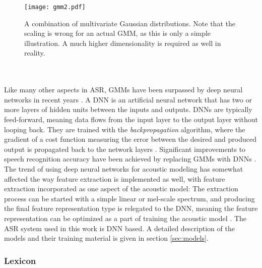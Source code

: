 \documentclass[english, 12pt, a4paper, pdftex, elec, utf8]{aaltothesis}
\begin{document}
\begin{figure}[b]
	\centering
	\texttt{[image: gmm2.pdf]}
	\caption{A combination of multivariate Gaussian distributions. Note that the scaling is wrong for an actual GMM, as this is only a simple illustration. A much higher dimensionality is required as well in reality.}
	\label{fig:gmm} 
\end{figure} \\\\
Like many other aspects in ASR, GMMs have been surpassed by deep neural networks in recent years \cite{hinton2012deep}. A DNN is an artificial neural network that has two or more layers of hidden units between the inputs and outputs. DNNs are typically feed-forward, meaning data flows from the input layer to the output layer without looping back. They are trained with the \textit{backpropagation} algorithm, where the gradient of a cost function measuring the error between the desired and produced output is propagated back to the network layers \cite[p.~57--60]{yu2014automatic}. Significant improvements to speech recognition accuracy have been achieved by replacing GMMs with DNNs \cite{yu2014automatic, hinton2012deep, xiong2016achieving}. The trend of using deep neural networks for acoustic modeling has somewhat affected the way feature extraction is implemented as well, with feature extraction incorporated as one aspect of the acoustic model: The extraction process can be started with a simple linear or mel-scale spectrum, and producing the final feature representation type is relegated to the DNN, meaning the feature representation can be optimized as a part of training the acoustic model \cite{kallasjoki2016}. The ASR system used in this work is DNN based. A detailed description of the models and their training material is given in section \ref{sec:models}.

\subsubsection{Lexicon}
\end{document}

